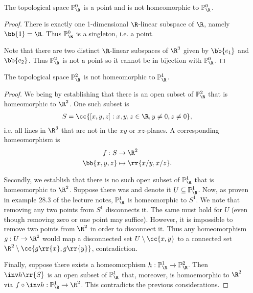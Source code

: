 \documentclass{article}
\begin{document}
\begin{claim}
  The topological space $\mathbb P^0_{\R}$ is a point and is not homeomorphic to $\mathbb P^0_{\R}$.
  \begin{proof}
    There is exactly one 1-dimensional $\R$-linear subspace of $\R$,
    namely $\bb{1}=\R$. Thus $\mathbb P^0_{\R}$ is a singleton, i.e.
    a point.

    Note that there are two distinct $\R$-linear subspaces of $\R^3$ given by $\bb{e_1}$ and
    $\bb{e_2}$. Thus $\mathbb P^2_{\R}$ is not a point so it cannot be in bijection with $\mathbb P^0_{\R}$.
  \end{proof}
\end{claim}

\begin{claim}
  The topological space $\mathbb P^2_{\R}$ is not homeomorphic to $\mathbb P^1_{\R}$.
  \begin{proof}
    We being by establishing that there is an open subset of $\mathbb P^2_{\R}$ that is
    homeomorphic to $\R^2$. One such subset is
    \begin{align*}
      S=\cc{[x,y,z] : x,y,z\in\R, y\neq 0, z\neq 0},
    \end{align*}
    i.e. all lines in $\R^3$ that are not in the $xy$ or $xz$-planes. A corresponding
    homeomorphism is
    \begin{align*}
      f:S &\to \R^2 \\
      \bb{x,y,z} &\mapsto \rr{x/y,x/z}.
    \end{align*}

    Secondly, we establish that there is no such open subset of $\mathbb P^1_{\R}$ that
    is homeomorphic to $\R^2$. Suppose there was and denote it $U\subseteq \mathbb P^1_{\R}$.
    Now, as proven in example 28.3 of the lecture notes, $\mathbb P^1_{\R}$ is homeomorphic 
    to $S^1$. We note that removing any two points from $S^1$ disconnects it.
    The same must hold for $U$ (even though removing zero or one point may suffice).
    However, it is impossible
    to remove two points from $\R^2$ in order to disconnect it. Thus any homeomorphism
    $g:U\to\R^2$ would map a disconnected set $U\setminus\cc{x,y}$ to a connected set
    $\R^2\setminus\cc{g\rr{x},g\rr{y}}$, contradiction.

    Finally, suppose there exists a homeomorphism $h:\mathbb P^1_{\R}\to\mathbb P^2_{\R}$.
    Then $\inv h\rr{S}$ is an open subset of $\mathbb P^1_{\R}$ that, moreover, is homoemorphic
    to $\R^2$ via $f\circ \inv h:\mathbb P^1_{\R}\to \R^2$. This contradicts the previous
    considerations.
  \end{proof}
\end{claim}
\end{document}
